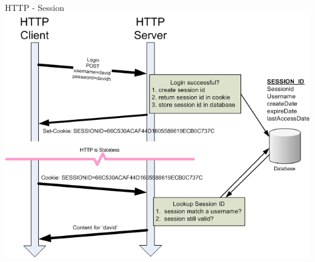 \begin{frame}{HTTP - Session}
  \includegraphics[width=\textwidth>]{sources/images/http_session_cookie_illustration.png}
\end{frame}
